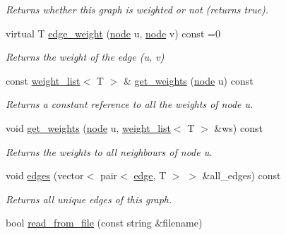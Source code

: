 \begin{DoxyCompactItemize}
\begin{DoxyCompactList}\small\item\em Returns whether this graph is weighted or not (returns true). \end{DoxyCompactList}\item 
virtual T \hyperlink{classlgraph_1_1utils_1_1wxgraph_ae634779d8d7f973fb7b7d2d9fb33c5c2}{edge\+\_\+weight} (\hyperlink{namespacelgraph_1_1utils_a7bd66ede3805ef121bc2835bd48de0cf}{node} u, \hyperlink{namespacelgraph_1_1utils_a7bd66ede3805ef121bc2835bd48de0cf}{node} v) const =0
\begin{DoxyCompactList}\small\item\em Returns the weight of the edge ({\itshape u}, {\itshape v}) \end{DoxyCompactList}\item 
const \hyperlink{namespacelgraph_1_1utils_a11e7963f3637ea13778b8d3e69d2c17f}{weight\+\_\+list}$<$ T $>$ \& \hyperlink{classlgraph_1_1utils_1_1wxgraph_a06252e99191d39329947c3a5eef43e73}{get\+\_\+weights} (\hyperlink{namespacelgraph_1_1utils_a7bd66ede3805ef121bc2835bd48de0cf}{node} u) const 
\begin{DoxyCompactList}\small\item\em Returns a constant reference to all the weights of node {\itshape u}. \end{DoxyCompactList}\item 
void \hyperlink{classlgraph_1_1utils_1_1wxgraph_a23c629eb031e31681749da793f933548}{get\+\_\+weights} (\hyperlink{namespacelgraph_1_1utils_a7bd66ede3805ef121bc2835bd48de0cf}{node} u, \hyperlink{namespacelgraph_1_1utils_a11e7963f3637ea13778b8d3e69d2c17f}{weight\+\_\+list}$<$ T $>$ \&ws) const 
\begin{DoxyCompactList}\small\item\em Returns the weights to all neighbours of node {\itshape u}. \end{DoxyCompactList}\item 
void \hyperlink{classlgraph_1_1utils_1_1wxgraph_a73b6c8887d5088750ee2cc98c45089c6}{edges} (vector$<$ pair$<$ \hyperlink{namespacelgraph_1_1utils_a6510284ce1b1ae5dc97ce5d2de426e10}{edge}, T $>$ $>$ \&all\+\_\+edges) const 
\begin{DoxyCompactList}\small\item\em Returns all unique edges of this graph. \end{DoxyCompactList}\item 
bool \hyperlink{classlgraph_1_1utils_1_1wxgraph_a329e674f9e3543f3347343470d82d404}{read\+\_\+from\+\_\+file} (const string \&filename)\hypertarget{classlgraph_1_1utils_1_1wxgraph_a329e674f9e3543f3347343470d82d404}{}\label{classlgraph_1_1utils_1_1wxgraph_a329e674f9e3543f3347343470d82d404}


\end{DoxyCompactItemize}
